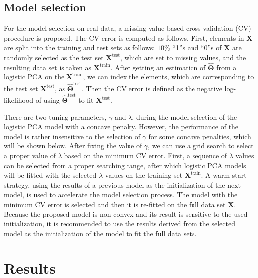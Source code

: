 \subsection{Model selection}
For the model selection on real data, a missing value based cross validation (CV) procedure is proposed. The CV error is computed as follows. First, elements in $\mathbf{X}$ are split into the training and test sets as follows: $10\%$ ``1''s and ``0''s of $\mathbf{X}$ are randomly selected as the test set $\mathbf{X}^{\text{test}}$, which are set to missing values, and the resulting data set is taken as $\mathbf{X}^{\text{train}}$. After getting an estimation of $\hat{\mathbf{\Theta}}$ from a logistic PCA on the $\mathbf{X}^{\text{train}}$, we can index the elements, which are corresponding to the test set $\mathbf{X}^{\text{test}}$, as $\hat{\mathbf{\Theta}}^{\text{test}}$. Then the CV error is defined as the negative log-likelihood of using $\hat{\mathbf{\Theta}}^{\text{test}}$ to fit $\mathbf{X}^{\text{test}}$.

There are two tuning parameters, $\gamma$ and $\lambda$, during the model selection of the logistic PCA model with a concave penalty. However, the performance of the model is rather insensitive to the selection of $\gamma$ for some concave penalties, which will be shown below. After fixing the value of $\gamma$, we can use a grid search to select a proper value of $\lambda$ based on the minimum CV error. First, a sequence of $\lambda$ values can be selected from a proper searching range, after which logistic PCA models will be fitted with the selected $\lambda$ values on the training set $\mathbf{X}^{\text{train}}$. A warm start strategy, using the results of a previous model as the initialization of the next model, is used to accelerate the model selection process. The model with the minimum CV error is selected and then it is re-fitted on the full data set $\mathbf{X}$. Because the proposed model is non-convex and its result is sensitive to the used initialization, it is recommended to use the results derived from the selected model as the initialization of the model to fit the full data sets.

\section{Results}
